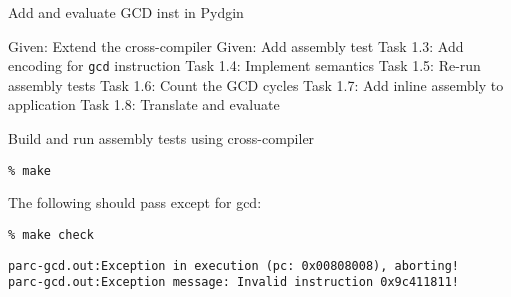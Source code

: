 \begin{frame}{ Add and evaluate GCD inst in Pydgin}
\begin{cbxlist}
  \1 Given: Extend the cross-compiler
  \1 Given: Add assembly test
  \1 
  \1 
  \1 Task 1.3: Add encoding for \texttt{gcd} instruction
  \1 Task 1.4: Implement semantics
  \1 Task 1.5: Re-run assembly tests
  \1 Task 1.6: Count the GCD cycles
  \1 Task 1.7: Add inline assembly to application
  \1 Task 1.8: Translate and evaluate
\end{cbxlist}
\end{frame}


\begin{task}
\begin{frame}[fragile]{Build and run assembly tests using cross-compiler}

\begin{Verbatim}[commandchars=\\\{\}]
% cd \midtilde/pydgin/parc/asm_tests_build
% make
\end{Verbatim}

The following should pass except for gcd:

\begin{verbatim}
% make check
\end{verbatim}

{\small
\begin{verbatim}
parc-gcd.out:Exception in execution (pc: 0x00808008), aborting!
parc-gcd.out:Exception message: Invalid instruction 0x9c411811!
\end{verbatim}}

\end{frame}
\end{task}


